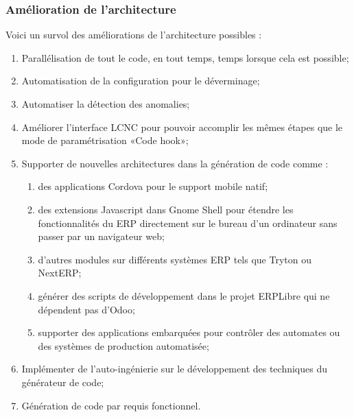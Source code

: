 \subsubsection{Amélioration de l’architecture}

Voici un survol des améliorations de l'architecture possibles :

\begin{enumerate}
    \item Parallélisation de tout le code, en tout temps, temps lorsque cela est possible;
    \item Automatisation de la configuration pour le déverminage;
    \item Automatiser la détection des anomalies;
    \item Améliorer l’interface LCNC pour pouvoir accomplir les mêmes étapes que le mode de paramétrisation «Code hook»;
    \item Supporter de nouvelles architectures dans la génération de code comme :
        \begin{enumerate}
        \item des applications Cordova pour le support mobile natif;
        \item des extensions Javascript dans Gnome Shell pour étendre les fonctionnalités du ERP directement sur le bureau d’un ordinateur sans passer par un navigateur web;
        \item d'autres modules sur différents systèmes ERP tels que Tryton ou NextERP;
        \item générer des scripts de développement dans le projet ERPLibre qui ne dépendent pas d’Odoo;
        \item supporter des applications embarquées pour contrôler des automates ou des systèmes de production automatisée;
        \end{enumerate}
    \item Implémenter de l'auto-ingénierie sur le développement des techniques du générateur de code;
    \item Génération de code par requis fonctionnel.
\end{enumerate}


